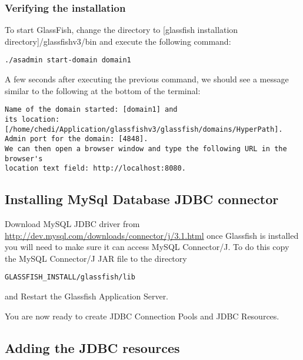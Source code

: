 \subsubsection{Verifying the installation}
To start GlassFish, change the directory to [glassfish installation directory]/glassfishv3/bin and execute the following command: \\
\begin{verbatim}
./asadmin start-domain domain1
\end{verbatim}

A few seconds after executing the previous command, we should see a message similar to the following at the bottom of the terminal: \\
\begin{verbatim}
Name of the domain started: [domain1] and
its location: [/home/chedi/Application/glassfishv3/glassfish/domains/HyperPath].
Admin port for the domain: [4848].
We can then open a browser window and type the following URL in the browser's
location text field: http://localhost:8080.
\end{verbatim}

\subsection{Installing MySql Database JDBC connector}
Download MySQL JDBC driver from
\url{http://dev.mysql.com/downloads/connector/j/3.1.html} once Glassfish is
installed you will need to make sure it can access MySQL Connector/J. To do this
copy the MySQL Connector/J JAR file to the directory
\begin{verbatim}GLASSFISH_INSTALL/glassfish/lib\end{verbatim} and Restart the
Glassfish Application Server.

You are now ready to create JDBC Connection Pools and JDBC Resources.
\subsection{Adding the JDBC resources}
